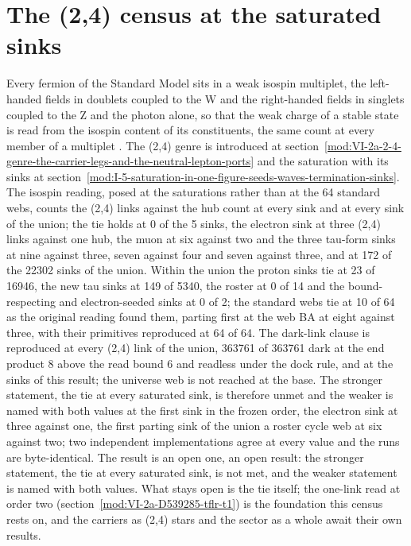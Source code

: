 \section{The (2,4) census at the saturated sinks}\label{mod:VI-2a-D539311-w-tfcs}
Every fermion of the Standard Model sits in a weak isospin multiplet, the left-handed fields in doublets coupled to the W and the right-handed fields in singlets coupled to the Z and the photon alone, so that the weak charge of a stable state is read from the isospin content of its constituents, the same count at every member of a multiplet \cite{Glashow1961,Weinberg1967}. The (2,4) genre is introduced at section~\ref{mod:VI-2a-2-4-genre-the-carrier-legs-and-the-neutral-lepton-ports} and the saturation with its sinks at section~\ref{mod:I-5-saturation-in-one-figure-seeds-waves-termination-sinks}.
The isospin reading, posed at the saturations rather than at the 64 standard webs, counts the (2,4) links against the hub count at every sink and at every sink of the union; the tie holds at 0 of the 5 sinks, the electron sink at three (2,4) links against one hub, the muon at six against two and the three tau-form sinks at nine against three, seven against four and seven against three, and at 172 of the 22302 sinks of the union.
Within the union the proton sinks tie at 23 of 16946, the new tau sinks at 149 of 5340, the roster at 0 of 14 and the bound-respecting and electron-seeded sinks at 0 of 2; the standard webs tie at 10 of 64 as the original reading found them, parting first at the web BA at eight against three, with their primitives reproduced at 64 of 64. The dark-link clause is reproduced at every (2,4) link of the union, 363761 of 363761 dark at the end product 8 above the read bound 6 and readless under the dock rule, and at the sinks of this result; the universe web is not reached at the base. The stronger statement, the tie at every saturated sink, is therefore unmet and the weaker is named with both values at the first sink in the frozen order, the electron sink at three against one, the first parting sink of the union a roster cycle web at six against two; two independent implementations agree at every value and the runs are byte-identical.
The result is an open one, an open result: the stronger statement, the tie at every saturated sink, is not met, and the weaker statement is named with both values.
What stays open is the tie itself; the one-link read at order two (section~\ref{mod:VI-2a-D539285-tflr-t1}) is the foundation this census rests on, and the carriers as (2,4) stars and the sector as a whole await their own results.

